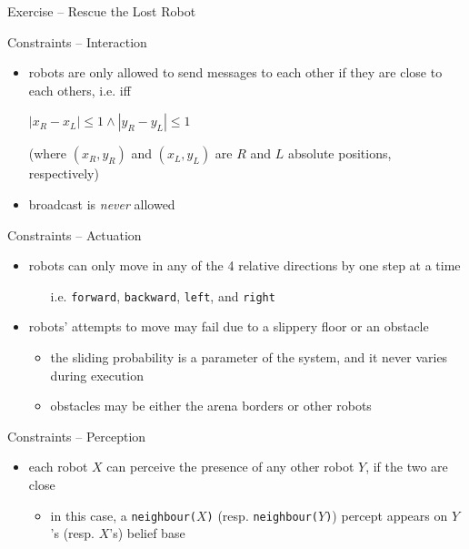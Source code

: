 \documentclass[presentation]{beamer}\mode<presentation>{\usetheme{AMSBolognaFC}}
\begin{document}
\begin{frame}[c, allowframebreaks]{Exercise \theJasonExample{} -- Rescue the Lost Robot}
    \begin{exampleblock}{Constraints -- Interaction}
        \begin{itemize}
            \item robots are only allowed to send messages to each other if they are \alert{close} to each others, i.e. iff
            \begin{center}
                $|x_R - x_L| \leq 1 \wedge |y_R - y_L| \leq 1$
            \end{center} 
            (where $(x_R, y_R)$ and $(x_L, y_L)$ are $R$ and $L$ \alert{absolute} positions, respectively)
            
            \item broadcast is \emph{never} allowed
        \end{itemize}
    \end{exampleblock}

    \begin{exampleblock}{Constraints -- Actuation}
        \begin{itemize}
            \item robots can only \alert{move} in any of the \alert{4 relative directions} by one step at a time
            \begin{itemize}
                \item[i.e.] \texttt{forward}, \texttt{backward}, \texttt{left}, and \texttt{right}
            \end{itemize}
        
            \item robots' attempts to move may fail due to a \alert{slippery floor} or an \alert{obstacle}
            \begin{itemize}
                \item the \alert{sliding probability} is a parameter of the system, and it never varies during execution
                
                \item obstacles may be either the arena borders or other robots
            \end{itemize}
            
        \end{itemize}
    \end{exampleblock}

    \begin{exampleblock}{Constraints -- Perception}
        \begin{itemize}
            \item each robot $X$ can perceive the \alert{presence} of any other robot $Y$, if the two are close
            \begin{itemize}
                \item in this case, a \texttt{neighbour($X$)} (resp. \texttt{neighbour($Y$)}) percept appears on $Y$'s (resp. $X$'s) belief base
            \end{itemize}
        

\end{itemize}
\end{exampleblock}
\end{frame}
\end{document}
